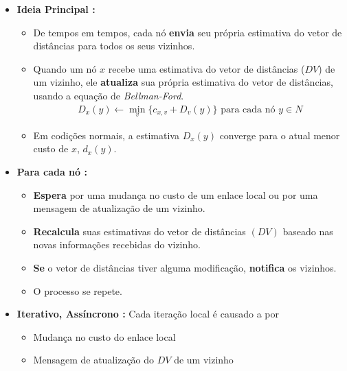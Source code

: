             \begin{itemize}[left=0.5cm, align=left, nosep]
                \item \textbf{Ideia Principal :}
                \begin{itemize}[left=0.5cm, nosep, label=$\hookrightarrow$]
                    \item De tempos em tempos, cada nó \textbf{envia} seu própria estimativa do vetor de distâncias para todos os seus vizinhos.
                    \item Quando um nó $x$ recebe uma estimativa do vetor de distâncias ($DV$) de um vizinho, ele \textbf{atualiza} sua própria 
                    estimativa do vetor de distâncias, usando a equação de \textit{Bellman-Ford}.
                    \begin{align*}
                        D_x(y) \leftarrow \min_{v} \{c_{x,v} + D_v(y)\} \text{ para cada nó } y \in N
                    \end{align*} 
                    \item Em codições normais, a estimativa $D_x(y)$ converge para o atual menor custo de $x$, $d_x(y)$.
                \end{itemize}
                
                \item \textbf{Para cada nó :}
                \begin{itemize}[left=0.5cm, nosep, label=$\hookrightarrow$]
                    \item \textbf{Espera} por uma mudança no custo de um enlace local ou por uma mensagem de atualização de um vizinho.
                    \item \textbf{Recalcula} suas estimativas do vetor de distâncias $(DV)$ baseado nas novas informações recebidas do vizinho.
                    \item \textbf{Se} o vetor de distâncias tiver alguma modificação, \textbf{notifica} os vizinhos.
                    \item O processo se repete.
                \end{itemize}
            
                \item \textbf{Iterativo, Assíncrono :} Cada iteração local é causado a por
                \begin{itemize}[left=0.5cm, nosep, label=$\hookrightarrow$]
                    \item Mudança no custo do enlace local
                    \item Mensagem de atualização do $DV$ de um vizinho
                \end{itemize}
            

\end{itemize}
